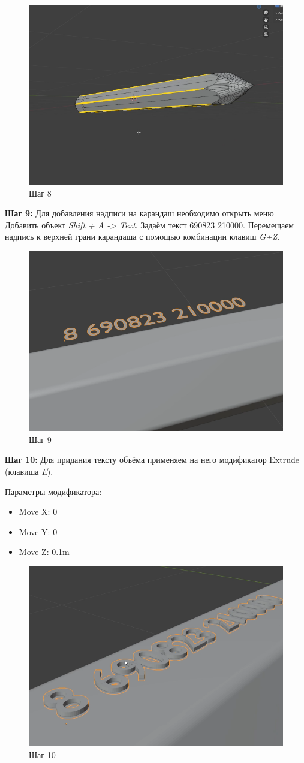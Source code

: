 \documentclass[areasetadvanced]{scrartcl}
\begin{document}
\begin{figure}[H]
    \label{4} 
    \centering
    \includegraphics[width=0.6\linewidth]{pen/8.png}
    \caption{Шаг 8}
\end{figure} 



\par \textbf{Шаг 9:} Для добавления надписи на карандаш необходимо открыть меню Добавить объект \textit{Shift + A -> Text}. Задаём текст  690823 210000\guillemotright. Перемещаем надпись к верхней грани карандаша с помощью комбинации клавиш \textit{G+Z}.
\begin{figure}[H]
    \label{4} 
    \centering
    \includegraphics[width=0.6\linewidth]{pen/9.png}
    \caption{Шаг 9}
\end{figure}


\par \textbf{Шаг 10:} Для придания тексту объёма применяем на него модификатор Extrude (клавиша \textit{E}).
\par Параметры модификатора:
\begin{itemize}
    \item Move X: 0
    \item Move Y: 0
    \item Move Z: 0.1m
\end{itemize}

\begin{figure}[H]
    \label{4} 
    \centering
    \includegraphics[width=0.6\linewidth]{pen/10.png}
    \caption{Шаг 10}
\end{figure}
\end{document}
